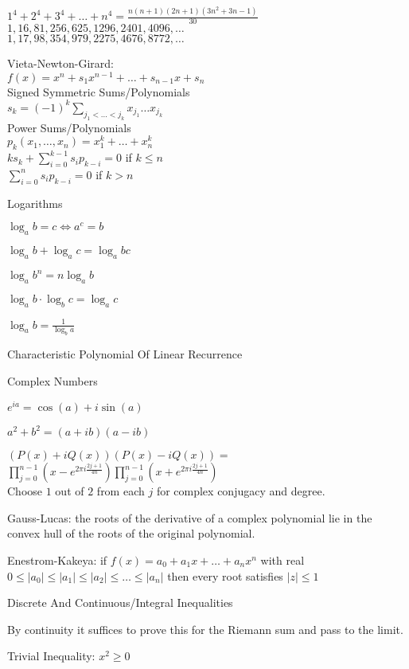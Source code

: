 $1^4+2^4+3^4+\dots+n^4 = \frac{n(n+1)(2n+1)(3n^2+3n-1)}{30}$ \\
$1,16,81,256,625,1296,2401,4096,\dots$ \\
$1,17,98,354,979,2275,4676,8772,\dots$

Vieta-Newton-Girard: \\
$f(x)=x^n+s_1 x^{n-1}+\dots+s_{n-1} x+s_n$ \\
Signed Symmetric Sums/Polynomials \\
$s_k = (-1)^k \sum_{j_1 < \dots < j_k} x_{j_1} \dots x_{j_k}$ \\
Power Sums/Polynomials \\
$p_k (x_1,\dots,x_n)=x_1^k+\dots+x_n^k$ \\
$ks_k + \sum_{i=0}^{k-1} s_i p_{k-i} = 0$ if $k \le n$ \\
$\sum_{i=0}^n s_i p_{k-i} = 0$ if $k>n$

Logarithms

$\log_a b=c \iff a^c=b$

$\log_a b+\log_a c=\log_a bc$

$\log_a b^n=n\log_a b$

$\log_a b \cdot \log_b c=\log_a c$

$\log_a b=\frac{1}{\log_b a}$

Characteristic Polynomial Of Linear Recurrence

Complex Numbers

$e^{ia}=\cos(a)+i\sin(a)$

$a^2+b^2=(a+ib)(a-ib)$

$(P(x)+iQ(x))(P(x)-iQ(x)) =$ \\
$\prod_{j=0}^{n-1} \left(x-e^{2 \pi i \frac{2j+1}{4n}} \right) \prod_{j=0}^{n-1} \left(x+e^{2 \pi i \frac{2j+1}{4n}} \right)$ \\
Choose $1$ out of $2$ from each $j$ for complex conjugacy and degree.

Gauss-Lucas: the roots of the derivative of a complex polynomial lie in the convex hull of the roots of the original polynomial.

Enestrom-Kakeya: if $f(x)=a_0+a_1 x+\dots+a_n x^n$ with real $0 \le |a_0| \le |a_1| \le |a_2| \le \dots \le |a_n|$ then every root satisfies $|z| \le 1$

Discrete And Continuous/Integral Inequalities

By continuity it suffices to prove this for the Riemann sum and pass to the limit.

Trivial Inequality: $x^2 \ge 0$

